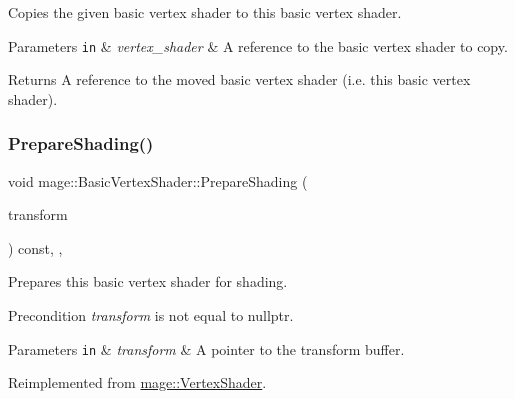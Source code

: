 Copies the given basic vertex shader to this basic vertex shader.


\begin{DoxyParams}[1]{Parameters}
\mbox{\tt in}  & {\em vertex\+\_\+shader} & A reference to the basic vertex shader to copy. \\
\hline
\end{DoxyParams}
\begin{DoxyReturn}{Returns}
A reference to the moved basic vertex shader (i.\+e. this basic vertex shader). 
\end{DoxyReturn}
\hypertarget{classmage_1_1_basic_vertex_shader_ae565cb19b96591d5d1ff36ac0ff7344c}{}\label{classmage_1_1_basic_vertex_shader_ae565cb19b96591d5d1ff36ac0ff7344c} 
\subsubsection{\texorpdfstring{Prepare\+Shading()}{PrepareShading()}}
{\footnotesize\ttfamily void mage\+::\+Basic\+Vertex\+Shader\+::\+Prepare\+Shading (\begin{DoxyParamCaption}\item[{I\+D3\+D11\+Buffer $\ast$}]{transform }\end{DoxyParamCaption}) const\hspace{0.3cm}{\ttfamily [final]}, {\ttfamily [override]}, {\ttfamily [virtual]}}

Prepares this basic vertex shader for shading.

\begin{DoxyPrecond}{Precondition}
{\itshape transform} is not equal to {\ttfamily nullptr}. 
\end{DoxyPrecond}

\begin{DoxyParams}[1]{Parameters}
\mbox{\tt in}  & {\em transform} & A pointer to the transform buffer. \\
\hline
\end{DoxyParams}


Reimplemented from \hyperlink{classmage_1_1_vertex_shader_a53f4b25241f6c5739724d421c9f29a36}{mage\+::\+Vertex\+Shader}.


